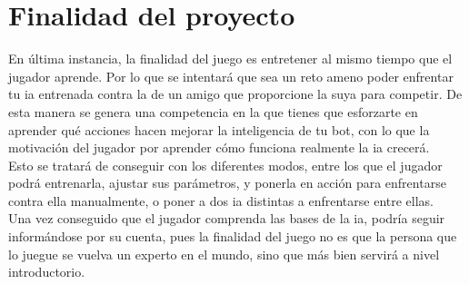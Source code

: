 \section{Finalidad del proyecto}
En última instancia, la finalidad del juego es entretener al mismo tiempo que el jugador aprende. Por lo que se intentará que sea un reto ameno poder enfrentar tu \gls{ia} entrenada contra la de un amigo que proporcione la suya para competir. De esta manera se genera una competencia en la que tienes que esforzarte en aprender qué acciones hacen mejorar la inteligencia de tu bot, con lo que la motivación del jugador por aprender cómo funciona realmente la \gls{ia} crecerá.
\\
Esto se tratará de conseguir con los diferentes modos, entre los que el jugador podrá entrenarla, ajustar sus parámetros, y ponerla en acción para enfrentarse contra ella manualmente, o poner a dos \gls{ia} distintas a enfrentarse entre ellas.
\\
Una vez conseguido que el jugador comprenda las bases de la \gls{ia}, podría seguir informándose por su cuenta, pues la finalidad del juego no es que la persona que lo juegue se vuelva un experto en el mundo, sino que más bien servirá a nivel introductorio. 

